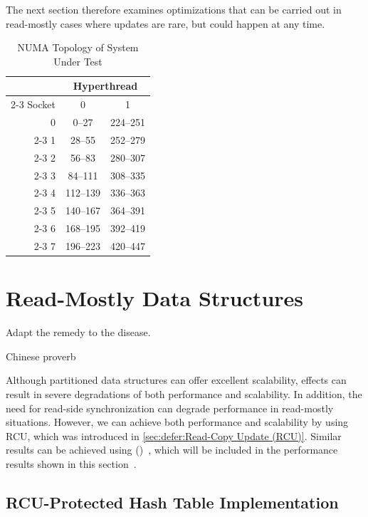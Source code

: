 The next section therefore examines optimizations that can be carried out in
read-mostly cases where updates are rare, but could happen at any time.

\begin{table}
\renewcommand*{\arraystretch}{1.2}
\centering
\begin{tabular}{r||c|c}
	& \multicolumn{2}{c}{Hyperthread} \\
	\cline{2-3}
	Socket & 0 &  1 \\
	\hline
	\hline
	0 &    0--27 & 224--251 \\
	\cline{2-3}
	1 &   28--55 & 252--279 \\
	\cline{2-3}
	2 &   56--83 & 280--307 \\
	\cline{2-3}
	3 &  84--111 & 308--335 \\
	\cline{2-3}
	4 & 112--139 & 336--363 \\
	\cline{2-3}
	5 & 140--167 & 364--391 \\
	\cline{2-3}
	6 & 168--195 & 392--419 \\
	\cline{2-3}
	7 & 196--223 & 420--447 \\
\end{tabular}
\caption{NUMA Topology of System Under Test}
\label{fig:datastruct:NUMA Topology of System Under Test}
\end{table}

\section{Read-Mostly Data Structures}
\label{sec:datastruct:Read-Mostly Data Structures}
%
\epigraph{Adapt the remedy to the disease.}{Chinese proverb}

Although partitioned data structures can offer excellent scalability,
 effects can result in severe degradations of both performance and
scalability.
In addition,
the need for read-side synchronization can degrade performance in
read-mostly situations.
However, we can achieve both performance and scalability by using
RCU, which was introduced in
\cref{sec:defer:Read-Copy Update (RCU)}.
Similar results can be achieved using 
()~\cite{MagedMichael04a}, which will be included in
the performance results shown in this
section~\cite{McKenney:2013:SDS:2483852.2483867}.

\subsection{RCU-Protected Hash Table Implementation}
\label{sec:datastruct:RCU-Protected Hash Table Implementation}

